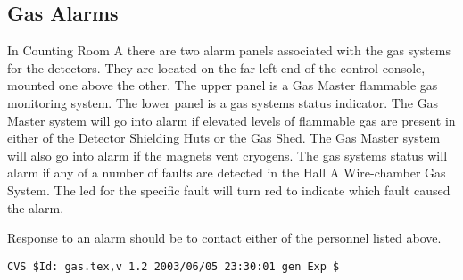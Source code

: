 \subsection{Gas Alarms}

In Counting Room A there are two alarm panels associated with the gas
systems for the detectors.  They are located on the far left end of the
control console, mounted one above the other.  The upper panel is a
Gas Master flammable gas monitoring system.  The lower panel is a gas
systems status indicator.  The Gas Master system will go into alarm if
elevated levels of flammable gas are present in either of the Detector
Shielding Huts or the Gas Shed.  The Gas Master system will also go into
alarm if the magnets vent cryogens.  The gas systems status will
alarm if any of a number of faults are detected in the Hall A Wire-chamber
Gas System.  The led for the specific fault will turn red to indicate which
fault caused the alarm.

Response to an alarm should be to contact either of the personnel listed above.
%
%
{\small
\begin{verbatim}CVS $Id: gas.tex,v 1.2 2003/06/05 23:30:01 gen Exp $\end{verbatim}
}
